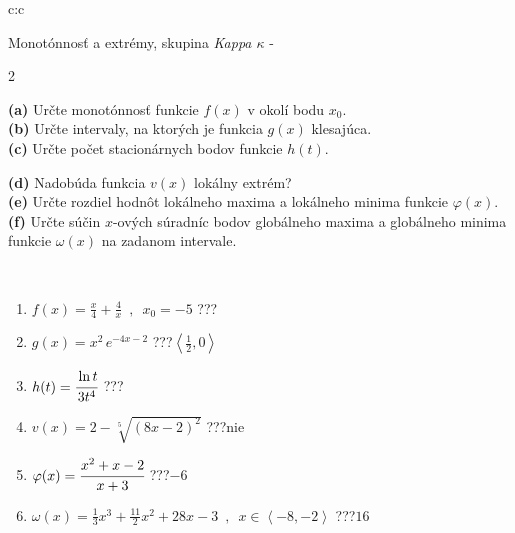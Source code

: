 \documentclass[10pt]{report}
\begin{document}
\newpage
\thispagestyle{empty}
\begin{tabular}{c:c}
\begin{minipage}[c][104.5mm][t]{0.5\linewidth}
\begin{center}
\vspace{7mm}
{\huge Monotónnosť a extrémy, skupina \textit{Kappa $\kappa$} -}\\[5mm]
\begin{minipage}{0.95\linewidth}
\begin{center}
{\small \begin{multicols}{2} \raggedright
\textbf{(a)} Určte monotónnosť funkcie \(f(x)\) v okolí bodu \(x_0\). \\[1mm]
\textbf{(b)} Určte intervaly, na ktorých je funkcia \(g(x)\) klesajúca. \\[1mm]
\textbf{(c)} Určte počet stacionárnych bodov funkcie \(h(t)\). \par \columnbreak
\textbf{(d)} Nadobúda funkcia \(v(x)\) lokálny extrém? \\[1mm]
\textbf{(e)} Určte rozdiel hodnôt lokálneho maxima a lokálneho minima funkcie \(\varphi(x)\). \\[1mm]
\textbf{(f)} Určte súčin \(x\)-ových súradníc bodov globálneho maxima a globálneho minima funkcie \(\omega(x)\) na zadanom intervale. \\[1mm]
\end{multicols}
}
\end{center}
\end{minipage}
\\[4mm]
\begin{minipage}{0.79\linewidth}
\begin{center}
\begin{varwidth}{\linewidth}
\begin{enumerate}
\normalsize
\item $f(x)=\frac{x}{4}+\frac{4}{x} \enspace , \enspace x_0=-5$\quad \dotfill\; ???\;\dotfill \quad {}
\item $g(x)=x^2\, e^{-4x-2}$\quad \dotfill\; ???\;\dotfill \quad $\left\langle\frac{1}{2} , 0\right\rangle$
\item $h(t)=\cfrac{\ln t}{3t^4}$\quad \dotfill\; ???\;\dotfill {}
\item $v(x)=2-\sqrt[5]{(8x-2)^2}$\quad \dotfill\; ???\;\dotfill \quad $\text{nie}$
\item $\varphi(x)=\cfrac{x^2+x-2}{x+3}$\quad \dotfill\; ???\;\dotfill \quad $-6$
\item $\omega(x)=\frac{1}{3}x^3+\frac{11}{2}x^2+28x-3 \enspace , \enspace x\in\left\langle-8 , -2\right\rangle$\quad \dotfill\; ???\;\dotfill \quad $16$

\end{enumerate}
\end{varwidth}
\end{center}
\end{minipage}
\end{center}
\end{minipage}
\end{tabular}
\end{document}
